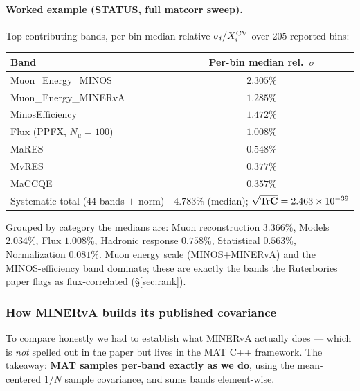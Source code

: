 \paragraph{Worked example (STATUS, full matcorr sweep).}
Top contributing bands, per-bin median relative
$\sigma_{i}/X^{\text{CV}}_{i}$ over $205$ reported bins:
\begin{center}
\begin{tabular}{@{}lc@{}}
\toprule
Band & Per-bin median rel.\ $\sigma$ \\
\midrule
Muon\_Energy\_MINOS & $2.305\%$ \\
Muon\_Energy\_MINERvA & $1.285\%$ \\
MinosEfficiency & $1.472\%$ \\
Flux (PPFX, $N_{u}=100$) & $1.008\%$ \\
MaRES & $0.548\%$ \\
MvRES & $0.377\%$ \\
MaCCQE & $0.357\%$ \\
\midrule
Systematic total (44 bands $+$ norm) & $\boxed{4.783\%}$ (median); $\sqrt{\mathrm{Tr}\mathbf{C}}=2.463\times10^{-39}$ \\
\bottomrule
\end{tabular}
\end{center}
Grouped by category the medians are: Muon reconstruction $3.366\%$,
Models $2.034\%$, Flux $1.008\%$, Hadronic response $0.758\%$,
Statistical $0.563\%$, Normalization $0.081\%$. Muon energy scale
(MINOS$+$MINERvA) and the MINOS-efficiency band dominate; these are
exactly the bands the Ruterbories paper flags as flux-correlated
(\S\ref{sec:rank}).

\subsubsection{How MINERvA builds its published covariance}
\label{sec:minerva}

To compare honestly we had to establish what MINERvA actually does ---
which is \emph{not} spelled out in the paper but lives in the MAT C++
framework. The takeaway: \textbf{MAT samples per-band exactly as we do},
using the mean-centered $1/N$ sample covariance, and sums bands
element-wise.

